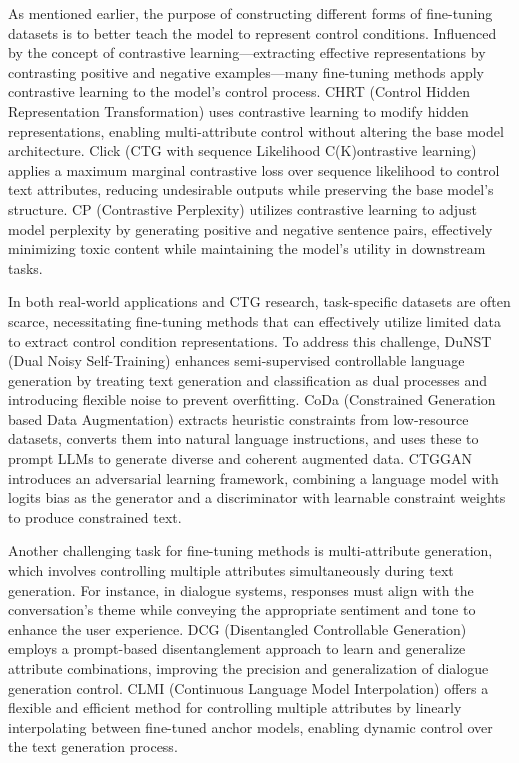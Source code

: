 \documentclass[acmsmall, screen]{acmart}
\begin{document}
As mentioned earlier, the purpose of constructing different forms of fine-tuning datasets is to better teach the model to represent control conditions. Influenced by the concept of contrastive learning—extracting effective representations by contrasting positive and negative examples—many fine-tuning methods apply contrastive learning to the model's control process. CHRT (Control Hidden Representation Transformation) \cite{kumar_acl23_CHRT} uses contrastive learning to modify hidden representations, enabling multi-attribute control without altering the base model architecture. Click (CTG with sequence Likelihood C(K)ontrastive learning)\cite{zheng_acl23_Click} applies a maximum marginal contrastive loss over sequence likelihood to control text attributes, reducing undesirable outputs while preserving the base model's structure. CP (Contrastive Perplexity) \cite{klein_arxiv24_CP} utilizes contrastive learning to adjust model perplexity by generating positive and negative sentence pairs, effectively minimizing toxic content while maintaining the model's utility in downstream tasks.

In both real-world applications and CTG research, task-specific datasets are often scarce, necessitating fine-tuning methods that can effectively utilize limited data to extract control condition representations. To address this challenge, DuNST (Dual Noisy Self-Training) \cite{feng_acl23_DuNST} enhances semi-supervised controllable language generation by treating text generation and classification as dual processes and introducing flexible noise to prevent overfitting. CoDa (Constrained Generation based Data Augmentation) \cite{evuru_arxiv24_CoDa} extracts heuristic constraints from low-resource datasets, converts them into natural language instructions, and uses these to prompt LLMs to generate diverse and coherent augmented data. CTGGAN \cite{yang_2024_CTGGAN} introduces an adversarial learning framework, combining a language model with logits bias as the generator and a discriminator with learnable constraint weights to produce constrained text.

Another challenging task for fine-tuning methods is multi-attribute generation, which involves controlling multiple attributes simultaneously during text generation. For instance, in dialogue systems, responses must align with the conversation's theme while conveying the appropriate sentiment and tone to enhance the user experience. DCG (Disentangled Controllable Generation) \cite{zeng_acl23_DCG} employs a prompt-based disentanglement approach to learn and generalize attribute combinations, improving the precision and generalization of dialogue generation control. CLMI (Continuous Language Model Interpolation) \cite{kangaslahti_arxiv24_CLMI} offers a flexible and efficient method for controlling multiple attributes by linearly interpolating between fine-tuned anchor models, enabling dynamic control over the text generation process.
\end{document}
